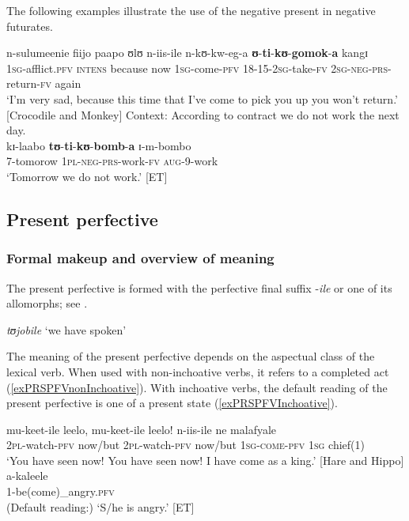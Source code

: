 The following examples illustrate the use of the negative present in negative futurates.
\begin{exe}
\ex \gll n-sulumeenie fiijo paapo ʊlʊ n-iis-ile n-kʊ-kw-eg-a \textbf{ʊ}-\textbf{ti}-\textbf{kʊ}-\textbf{gomok}-\textbf{a} kangɪ\\
\textsc{1sg}-afflict.\textsc{pfv} \textsc{intens} because now \textsc{1sg}-come-\textsc{pfv} 18-15-\textsc{2sg}-take-\textsc{fv} \textsc{2sg}-\textsc{neg}-\textsc{prs}-return-\textsc{fv} again\\
\glt \lq I'm very sad, because this time that I've come to pick you up you won't return.' [Crocodile and Monkey]
\ex Context: According to contract we do not work the next day.\\
\gll kɪ-laabo \textbf{tʊ}-\textbf{ti}-\textbf{kʊ}-\textbf{bomb}-\textbf{a} ɪ-m-bombo\\
7-tomorow \textsc{1pl}-\textsc{neg}-\textsc{prs}-work-\textsc{fv} \textsc{aug}-9-work\\
\glt `Tomorrow we do not work.' [ET]
\end{exe}

\subsection{Present perfective}\label{PresentPerfective}
\subsubsection{Formal makeup and overview of meaning}\label{PresentPerfectiveIntroduction}
The present perfective is formed with the perfective final suffix -\textit{ile} or one of its allomorphs; see .

\begin{exe}
\ex \label{exPRSPFVEinstiegsbeispiel} \textit{tʊjobile} \lq we have spoken'
\end{exe}

The meaning of the present perfective depends on the aspectual class of the lexical verb. When used with non-inchoative verbs, it refers to a completed act (\ref{exPRSPFVnonInchoative}). With inchoative verbs, the default reading of the present perfective is one of a present state (\ref{exPRSPFVInchoative}).

\begin{exe}
\ex \label{exPRSPFVnonInchoative} \gll mu-keet-ile leelo, mu-keet-ile leelo! n-iis-ile ne malafyale\\
\textsc{2pl}-watch-\textsc{pfv} now/but \textsc{2pl}-watch-\textsc{pfv} now/but \textsc{1sg}-\textsc{come}-\textsc{pfv} \textsc{1sg} chief(1)\\
\glt `You have seen now! You have seen now! I have come as a king.' [Hare and Hippo]
\ex \label{exPRSPFVInchoative} \gll a-kaleele\\
1-be(come)\_angry.\textsc{pfv}\\
\glt (Default reading:) \lq S/he is angry.' [ET]
\end{exe}

